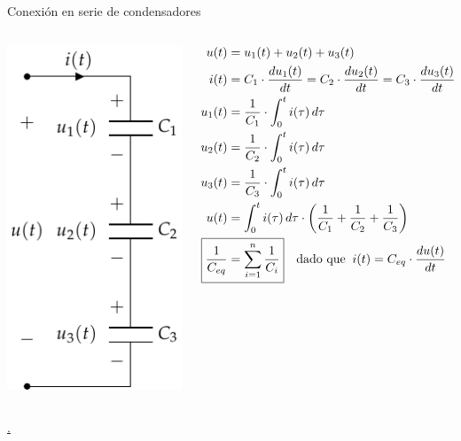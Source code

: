\documentclass[aspectratio=169, xcolor={usenames,svgnames,dvipsnames}]{beamer}
\begin{document}
\begin{frame}{Conexión en serie de condensadores}
    \begin{columns}
    \begin{column}{0.3\columnwidth}
    \begin{center}
    \includegraphics[height=0.85\textheight]{../figs/CondensadoresSerie.pdf}
    \end{center}
    \end{column}
    \begin{column}{0.7\columnwidth}
    \begin{align*}
      u(t) & = u_1(t) + u_2(t) + u_3(t)\\
      i(t) &= C_1 \cdot \frac{du_1(t)}{dt}= C_2 \cdot \frac{du_2(t)}{dt}= C_3 \cdot \frac{du_3(t)}{dt}\\
      u_1(t)&=\dfrac{1}{C_1}\cdot\int_{0}^{t} i(\tau)\, d\tau\\
      u_2(t)&=\dfrac{1}{C_2}\cdot\int_{0}^{t} i(\tau)\, d\tau\\
      u_3(t)&=\dfrac{1}{C_3}\cdot\int_{0}^{t} i(\tau)\, d\tau\\
      u(t)& = \int_{0}^{t} i(\tau)\,d\tau \cdot \left(\dfrac{1}{C_1}+\dfrac{1}{C_2}+\dfrac{1}{C_3}\right)\\
      \Aboxed{\frac{1}{C_{eq}} &= \sum_{i = 1}^n \frac{1}{C_i}} \quad \textrm{dado que} \;\; i(t) = C_{eq} \cdot \frac{du(t)}{dt}
    \end{align*}
    \end{column}
    \end{columns}
    \hyperlink{diapo:condensadores_paralelo}{.}
\end{frame}
\end{document}
